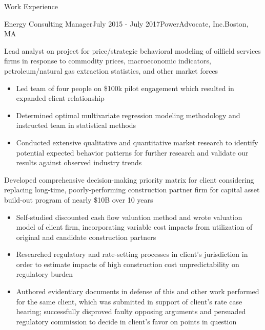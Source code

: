 \documentclass{resume} %
\begin{document}

\begin{rSection}{Work Experience}

\begin{rSubsection}{Energy Consulting Manager}{July 2015 - July 2017}{PowerAdvocate, Inc.}{Boston, MA}
  \setlength{\itemsep}{-5pt}
  \item Lead analyst on project for price/strategic behavioral modeling of oilfield services firms in response to commodity prices, macroeconomic indicators, petroleum/natural gas extraction statistics, and other market forces
  \begin{itemize}
    \item Led team of four people on \$100k pilot engagement which resulted in expanded client relationship
    \item Determined optimal multivariate regression modeling methodology and instructed team in statistical methods
    \item Conducted extensive qualitative and quantitative market research to identify potential expected behavior patterns for further research and validate our results against observed industry trends
  \end{itemize}
  \item Developed comprehensive decision-making priority matrix for client considering replacing long-time, poorly-performing construction partner firm for capital asset build-out program of nearly \$10B over 10 years
  \begin{itemize}
    \setlength{\itemsep}{-5pt}
    \item Self-studied discounted cash flow valuation method and wrote valuation model of client firm, incorporating variable cost impacts from utilization of original and candidate construction partners
    \item Researched regulatory and rate-setting processes in client's jurisdiction in order to estimate impacts of high construction cost unpredictability on regulatory burden
    \item Authored evidentiary documents in defense of this and other work performed for the same client, which was submitted in support of client's rate case hearing; successfully disproved faulty opposing arguments and persuaded regulatory commission to decide in client's favor on points in question
  \end{itemize}
\end{rSubsection}


\end{rSection}
\end{document}
